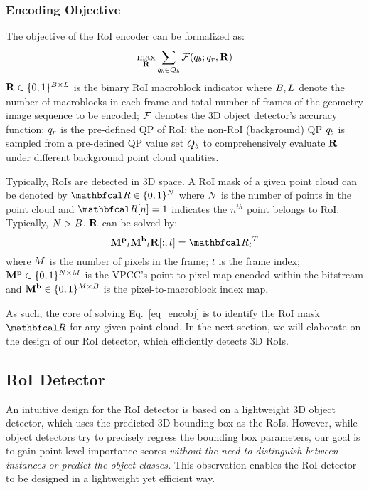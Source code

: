 \subsubsection{Encoding Objective}
\label{sec-encoding-objective}
The objective of the RoI encoder can be formalized as:
\begin{equation}
\max_{\mathbf{R}}\sum_{{q_{b}}\in{Q_{b}}}{\mathcal{F}}({q_{b}};{q_{r}},\mathbf{R})
\label{eq_encobj}
\end{equation}
$\mathbf{R}\in \{0,1\}^{B \times {L}}$ is the binary RoI macroblock indicator where $B, {L}$ denote the number of macroblocks in each frame and total number of frames of the geometry image sequence to be encoded; ${\mathcal{F}}$ denotes the 3D object detector's accuracy function;  ${q_{r}}$ is the pre-defined QP of RoI; the non-RoI (background) QP ${q_{b}}$ is sampled from a pre-defined QP value set ${Q_{b}}$ to comprehensively evaluate $\mathbf{R}$ under different background point cloud qualities.

Typically, RoIs are detected in 3D space. A RoI mask of a given point cloud can be denoted by $\roimaskpc \in \{0,1\}^{\pointnum}$ where $N$ is the number of points in the point cloud and $\roimaskpc[n]=1$ indicates the $n^{th}$ point belongs to RoI.  Typically, $N>B$. $\mathbf{R}$ can be solved by:
\begin{equation}
    \ptpixmap_t\pixmbmap_t\roimaskimg[:,t] = {\roimaskpc_t}^T 
\end{equation}
where ${M}$ is the number of pixels in the frame; $t$ is the frame index; ${\mathbf{M^p}} \in \{0,1\}^{N \times {M}}$ is the VPCC's point-to-pixel map encoded within the bitstream and ${\mathbf{M^b}} \in \{0,1\}^{{M} \times B}$ is the pixel-to-macroblock index map.

As such, the core of solving Eq.~\ref{eq_encobj} is to identify the RoI mask $\roimaskpc$ for any given point cloud. In the next section, we will elaborate on the design of our RoI detector, which efficiently detects 3D RoIs.

\subsection{RoI Detector}
An intuitive design for the RoI detector is based on a lightweight 3D object detector, which uses the predicted 3D bounding box as the RoIs.
However, while object detectors try to precisely regress the bounding box parameters, our goal is to gain point-level importance scores \textit{without the need to distinguish between instances or predict the object classes.} This observation enables the RoI detector to be designed in a lightweight yet efficient way. 

